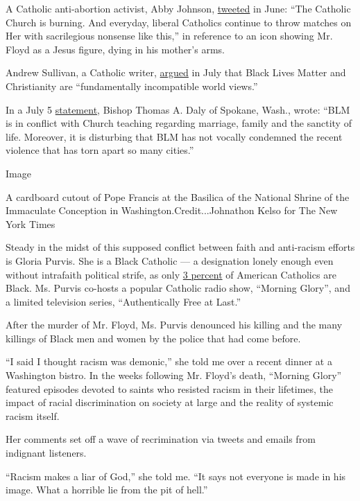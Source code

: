 A Catholic anti-abortion activist, Abby Johnson,
\href{https://twitter.com/AbbyJohnson/status/1277590055490633730}{tweeted}
in June: ``The Catholic Church is burning. And everyday, liberal
Catholics continue to throw matches on Her with sacrilegious nonsense
like this,'' in reference to an icon showing Mr. Floyd as a Jesus
figure, dying in his mother's arms.

Andrew Sullivan, a Catholic writer,
\href{https://twitter.com/sullydish/status/1287057974834462720}{argued}
in July that Black Lives Matter and Christianity are ``fundamentally
incompatible world views.''

In a July 5
\href{https://dioceseofspokane.org/news/statement-on-catholic-charities-eastern-washington-the-church-and-racism}{statement},
Bishop Thomas A. Daly of Spokane, Wash., wrote: ``BLM is in conflict
with Church teaching regarding marriage, family and the sanctity of
life. Moreover, it is disturbing that BLM has not vocally condemned the
recent violence that has torn apart so many cities.''

Image

A cardboard cutout of Pope Francis at the Basilica of the National
Shrine of the Immaculate Conception in Washington.Credit...Johnathon
Kelso for The New York Times

Steady in the midst of this supposed conflict between faith and
anti-racism efforts is Gloria Purvis. She is a Black Catholic --- a
designation lonely enough even without intrafaith political strife, as
only
\href{https://www.pewforum.org/religious-landscape-study/religious-tradition/catholic/}{3
percent} of American Catholics are Black. Ms. Purvis co-hosts a popular
Catholic radio show, ``Morning Glory'', and a limited television series,
``Authentically Free at Last.''

After the murder of Mr. Floyd, Ms. Purvis denounced his killing and the
many killings of Black men and women by the police that had come before.

``I said I thought racism was demonic,'' she told me over a recent
dinner at a Washington bistro. In the weeks following Mr. Floyd's death,
``Morning Glory'' featured episodes devoted to saints who resisted
racism in their lifetimes, the impact of racial discrimination on
society at large and the reality of systemic racism itself.

Her comments set off a wave of recrimination via tweets and emails from
indignant listeners.

``Racism makes a liar of God,'' she told me. ``It says not everyone is
made in his image. What a horrible lie from the pit of hell.''

